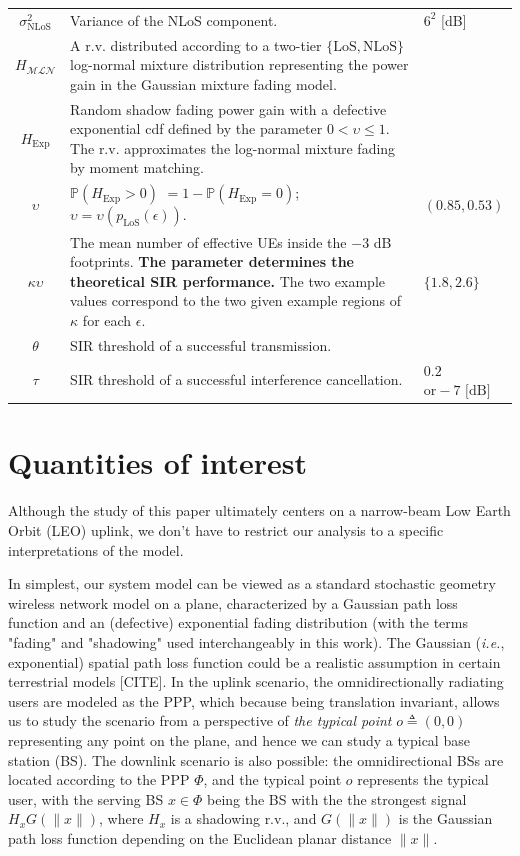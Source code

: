 \documentclass[lettersize,journal]{IEEEtran}
\begin{document}
\begin{table}
\begin{center}
\begin{tabular}{|c|p{4.5cm}|p{1.9cm}|}
      $\sigma^2_{\text{NLoS}}$& Variance of the NLoS component. & $6^2$ [dB] \\
      $H_{\mathcal{M}\mathcal{L}\mathcal{N}}$ & A r.v. distributed according to a two-tier $\{\text{LoS}, \text{NLoS}\}$ log-normal mixture distribution representing the power gain in the Gaussian mixture fading model.&   \\
      $H_{\text{Exp}}$ & Random shadow fading power gain with a defective exponential cdf defined by the parameter $0<\upsilon \leq 1$. The r.v. approximates the log-normal mixture fading by moment matching.&\\
      $\upsilon$ & $\mathbb{P}(H_{\text{Exp}}>0)$ $=1-\mathbb{P}(H_{\text{Exp}}=0)$; $\upsilon = \upsilon(p_{\text{LoS}}(\epsilon))$. &$(0.85,0.53)$ \\
      $\kappa \upsilon$ & The mean number of effective UEs inside the $-3$ dB footprints. \textbf{The parameter determines the theoretical SIR performance.} The two example values correspond to the two given example regions of $\kappa$ for each $\epsilon$.&$ \{1.8,2.6\}$ \\
      $\theta$ & SIR threshold of a successful transmission.&\\
      $\tau$ & SIR threshold of a successful interference cancellation.& $0.2$\hfill \break $\text{or} -7\text{ [dB]}$\\  
      \hline
    \end{tabular}
  \end{center}
\end{table}   


\section{Quantities of interest}
\label{sec:analysissec}

Although the study of this paper ultimately centers on a narrow-beam Low Earth Orbit (LEO) uplink, we don't have to restrict our analysis to a specific interpretations of the model.

In simplest, our system model can be viewed as a standard stochastic geometry wireless network model on a plane, characterized by a Gaussian path loss function and an (defective) exponential fading distribution (with the terms "fading" and "shadowing" used interchangeably in this work). The Gaussian (\textit{i.e.}, exponential) spatial path loss function could be a realistic assumption in certain terrestrial models [CITE]. In the uplink scenario, the omnidirectionally radiating users are modeled as the PPP, which because being translation invariant, allows us to study the scenario from a perspective of \textit{the typical point} $\textit{o} \triangleq (0,0)$ representing any point on the plane, and hence we can study a typical base station (BS). The downlink scenario is also possible: the omnidirectional BSs are located according to the PPP $\Phi$, and the typical point $\textit{o}$ represents the typical user, with the serving BS $x \in \Phi$ being the BS with the the strongest signal $H_xG(\|x\|)$, where $H_x$ is a shadowing r.v., and $G(\|x\|)$ is the Gaussian path loss function depending on the Euclidean planar distance $\|x\|$.
\end{document}
